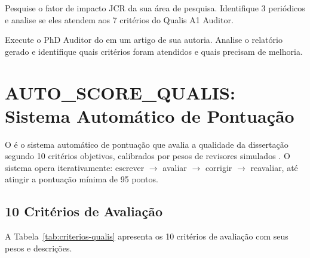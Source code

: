 \begin{exercicio}
    Pesquise o fator de impacto JCR da sua área de pesquisa. Identifique 3
    periódicos \qualisA{} e analise se eles atendem aos 7 critérios do Qualis
    A1 Auditor.
\end{exercicio}

\begin{exercicio}
    Execute o PhD Auditor do \opencodeeco{} em um artigo de sua autoria.
    Analise o relatório gerado e identifique quais critérios foram atendidos
    e quais precisam de melhoria.
\end{exercicio}

\section{AUTO\_SCORE\_QUALIS: Sistema Automático de Pontuação}
\label{sec:auto-score-qualis}
\nivelavancado

O  é o sistema automático de pontuação que
avalia a qualidade da dissertação segundo 10 critérios objetivos, calibrados
por pesos de revisores simulados \cite{opencode2026ecosystem}. O sistema opera
iterativamente: escrever $\rightarrow$ avaliar $\rightarrow$ corrigir
$\rightarrow$ reavaliar, até atingir a pontuação mínima de 95 pontos.

\subsection{10 Critérios de Avaliação}

A Tabela~\ref{tab:criterios-qualis} apresenta os 10 critérios de avaliação
com seus pesos e descrições.

